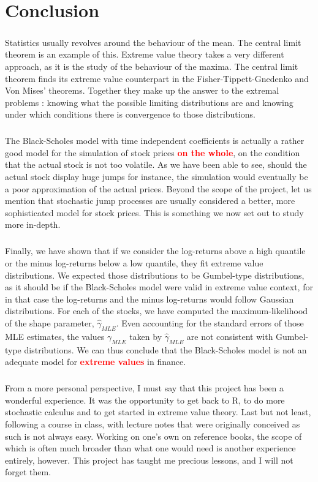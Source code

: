 \chapter{Conclusion}
\paragraph{}
Statistics usually revolves around the behaviour of the mean. The central limit theorem is an example of this. Extreme value theory takes a very different approach, as it is the study of the behaviour of the maxima. The central limit theorem finds its extreme value counterpart in the Fisher-Tippett-Gnedenko and Von Mises' theorems. Together they make up the answer to the extremal problems : knowing what the possible limiting distributions are and knowing under which conditions there is convergence to those distributions.
\paragraph{}
The Black-Scholes model with time independent coefficients is actually a rather good model for the simulation of stock prices \textbf{\textcolor{red}{on the whole}}, on the condition that the actual stock is not too volatile. As we have been able to see, should the actual stock display huge jumps for instance, the simulation would eventually be a poor approximation of the actual prices. Beyond the scope of the project, let us mention that stochastic jump processes are usually considered a better, more sophisticated model for stock prices. This is something we now set out to study more in-depth.
\paragraph{}
Finally, we have shown that if we consider the log-returns above a high quantile or the minus log-returns below a low quantile, they fit extreme value distributions. We expected those distributions to be Gumbel-type distributions, as it should be if the Black-Scholes model were valid in extreme value context, for in that case the log-returns and the minus log-returns would follow Gaussian distributions. For each of the stocks, we have computed the maximum-likelihood of the shape parameter, $\hat{\gamma}_{MLE}$. Even accounting for the standard errors of those MLE estimates, the values $\gamma_{MLE}$ taken by $\hat{\gamma}_{MLE}$ are not consistent with Gumbel-type distributions. We can thus conclude that the Black-Scholes model is not an adequate model for  \textbf{\textcolor{red}{extreme values}} in finance.
\bigskip
\paragraph{}
From a more personal perspective, I must say that this project has been a wonderful experience. It was the opportunity to get back to R, to do more stochastic calculus and to get started in extreme value theory. Last but not least, following a course in class, with lecture notes that were originally conceived as such is not always easy. Working on one's own on reference books, the scope of which is often much broader than what one would need is another experience entirely, however. This project has taught me precious lessons, and I will not forget them.